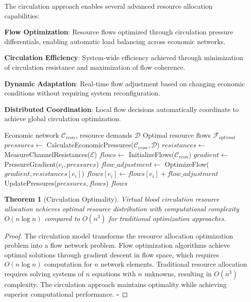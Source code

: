 \documentclass[12pt,a4paper]{article}
\newtheorem{theorem}{Theorem}
\begin{document}
The circulation approach enables several advanced resource allocation capabilities:

\textbf{Flow Optimization}: Resource flows optimized through circulation pressure differentials, enabling automatic load balancing across economic networks.

\textbf{Circulation Efficiency}: System-wide efficiency achieved through minimization of circulation resistance and maximization of flow coherence.

\textbf{Dynamic Adaptation}: Real-time flow adjustment based on changing economic conditions without requiring system reconfiguration.

\textbf{Distributed Coordination}: Local flow decisions automatically coordinate to achieve global circulation optimization.

\begin{algorithm}
\caption{Virtual Blood Circulation Resource Allocation}
\begin{algorithmic}[1]
\Require Economic network $\mathcal{C}_{econ}$, resource demands $\mathcal{D}$
\Ensure Optimal resource flows $\mathcal{F}_{optimal}$
\State $pressures \leftarrow$ CalculateEconomicPressures($\mathcal{C}_{econ}, \mathcal{D}$)
\State $resistances \leftarrow$ MeasureChannelResistances($\mathcal{E}$)
\State $flows \leftarrow$ InitializeFlows($\mathcal{C}_{econ}$)
        \State $gradient \leftarrow$ PressureGradient($e_i, pressures$)
        \State $flow\_adjustment \leftarrow$ OptimizeFlow($gradient, resistances[e_i]$)
        \State $flows[e_i] \leftarrow flows[e_i] + flow\_adjustment$
    \EndFor
    \State UpdatePressures($pressures, flows$)
\EndWhile
\Return $flows$
\end{algorithmic}
\end{algorithm}

\begin{theorem}[Circulation Optimality]
Virtual blood circulation resource allocation achieves optimal resource distribution with computational complexity $O(n \log n)$ compared to $O(n^3)$ for traditional optimization approaches.
\end{theorem}

\begin{proof}
The circulation model transforms the resource allocation optimization problem into a flow network problem. Flow optimization algorithms achieve optimal solutions through gradient descent in flow space, which requires $O(n \log n)$ computation for $n$ network elements. Traditional resource allocation requires solving systems of $n$ equations with $n$ unknowns, resulting in $O(n^3)$ complexity. The circulation approach maintains optimality while achieving superior computational performance. $\square$
\end{proof}
\end{document}
